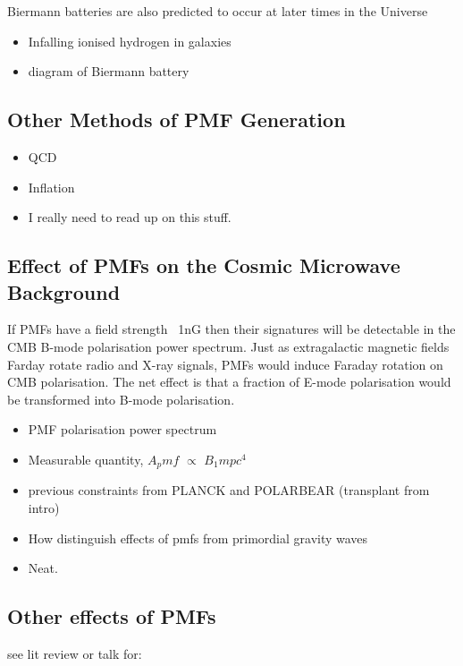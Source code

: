 Biermann batteries are also predicted to occur at later times in the Universe

\begin{itemize}
\item Infalling ionised hydrogen in galaxies
\item diagram of Biermann battery
\end{itemize}

\subsection{Other Methods of PMF Generation}

\begin{itemize}
\item QCD
\item Inflation
\item I really need to read up on this stuff.
\end{itemize}

\subsection{Effect of PMFs on the Cosmic Microwave Background}
If PMFs have a field strength ~1nG then their signatures will be detectable in the CMB B-mode polarisation power spectrum. Just as extragalactic magnetic fields Farday rotate radio and X-ray signals, PMFs would induce Faraday rotation on CMB polarisation. The net effect is that a fraction of E-mode polarisation would be transformed into B-mode polarisation.

\begin{itemize}
\item PMF polarisation power spectrum
\item Measurable quantity, $A_pmf$ $\propto$ $B_1mpc^4$
\item previous constraints from PLANCK and POLARBEAR (transplant from intro)
\item How distinguish effects of pmfs from primordial gravity waves
\item Neat.

\end{itemize}

\subsection{Other effects of PMFs}
see lit review or talk for:


